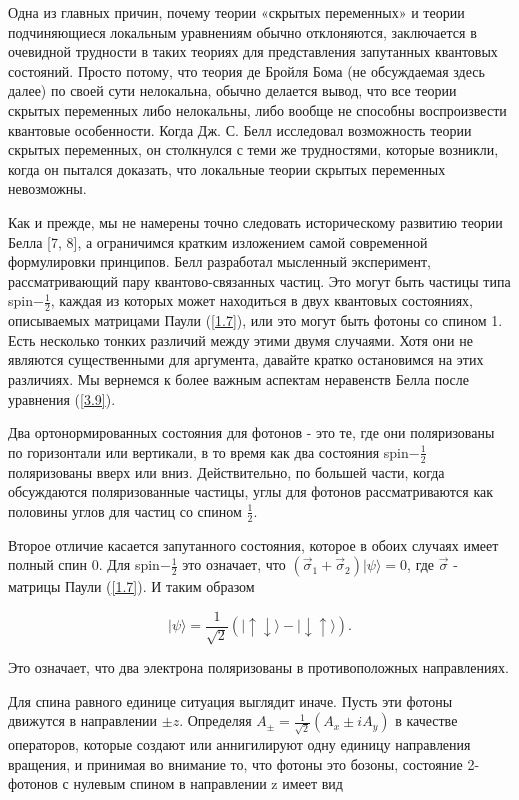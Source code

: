 \documentclass[main.tex]{subfiles}
\begin{document}
Одна из главных причин, почему теории «скрытых переменных» и теории подчиняющиеся локальным уравнениям обычно отклоняются, заключается в очевидной трудности в таких теориях для представления запутанных квантовых состояний. Просто потому, что теория де Бройля Бома (не обсуждаемая здесь далее) по своей сути нелокальна, обычно делается вывод, что все теории скрытых переменных либо нелокальны, либо вообще не способны воспроизвести квантовые особенности. Когда Дж. С. Белл исследовал возможность теории скрытых переменных, он столкнулся с теми же трудностями, которые возникли, когда он пытался доказать, что локальные теории скрытых переменных невозможны.

Как и прежде, мы не намерены точно следовать историческому развитию теории Белла [7, 8], а ограничимся кратким изложением самой современной формулировки принципов. Белл разработал мысленный эксперимент, рассматривающий пару квантово-связанных частиц. Это могут быть частицы типа spin$-\frac 1 2$, каждая из которых может находиться в двух квантовых состояниях, описываемых матрицами Паули (\ref{1.7}), или это могут быть фотоны со спином 1. Есть несколько тонких различий между этими двумя случаями. Хотя они не являются существенными для аргумента, давайте кратко остановимся на этих различиях. Мы вернемся к более важным аспектам неравенств Белла после уравнения (\ref{3.9}).

Два ортонормированных состояния для фотонов - это те, где они поляризованы по горизонтали или вертикали, в то время как два состояния spin$-\frac 1 2$ поляризованы вверх или вниз. Действительно, по большей части, когда обсуждаются поляризованные частицы, углы для фотонов рассматриваются как половины углов для частиц со спином $\frac 1 2$.

Второе отличие касается запутанного состояния, которое в обоих случаях имеет полный спин 0. Для spin$-\frac 1 2$ это означает, что $(\vec\sigma_1 + \vec\sigma_2)|\psi\rangle = 0$, где $\vec\sigma$ - матрицы Паули (\ref{1.7}). И таким образом 

\begin{equation}\label{3.6}
	|\psi\rangle=\frac{1}{\sqrt{2}}(|\uparrow \downarrow\rangle-|\downarrow \uparrow\rangle).
\end{equation}

Это означает, что два электрона поляризованы в противоположных направлениях.

Для спина равного единице ситуация выглядит иначе. Пусть эти фотоны движутся в направлении $\pm z$. Определяя $A_\pm = \frac 1 {\sqrt 2} (A_x \pm iA_y)$ в качестве операторов, которые создают или аннигилируют одну единицу направления вращения, и принимая во внимание то, что фотоны это бозоны, состояние 2-фотонов с нулевым спином в направлении z имеет вид
\end{document}
